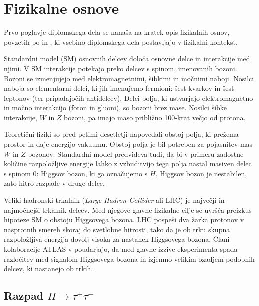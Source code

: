 \documentclass[11pt,a4paper,openany]{book}
\begin{document}


\chapter{Fizikalne osnove}
\label{ch:basics}
Prvo poglavje diplomskega dela se nanaša na kratek opis fizikalnih osnov, povzetih po \cite{AadScience2012} in \cite{ChallengeDoc}, ki vsebino diplomskega dela  postavljajo v fizikalni kontekst. 

Standardni model (SM) osnovnih delcev določa osnovne delce in interakcije med njimi. V SM interakcije potekajo preko delcev s spinom, imenovanih bozoni. Bozoni se izmenjujejo med elektromagnetnimi, šibkimi in močnimi naboji. Nosilci naboja so elementarni delci, ki jih imenujemo fermioni: šest kvarkov in šest leptonov (ter pripadajočih antidelcev). Delci polja, ki ustvarjajo elektromagnetno in močno interakcijo (foton in gluoni), so bozoni brez mase. Nosilci šibke interakcije, $W$ in $Z$ bozoni, pa imajo maso približno 100-krat večjo od protona. 

Teoretični fiziki so pred petimi desetletji napovedali obstoj polja, ki prežema prostor in daje energijo vakuumu. Obstoj polja je bil potreben za pojasnitev mas $W$ in $Z$ bozonov. Standardni model predvideva tudi, da bi v primeru zadostne količine razpoložljive energije lahko z vzbuditvijo tega polja nastal masiven delec s spinom 0: Higgsov bozon, ki ga označujemo s $H$. Higgsov bozon je nestabilen, zato hitro razpade v druge delce. 

Veliki hadronski trkalnik (\textit{Large Hadron Collider} ali {LHC}) je največji in najmočnejši trkalnik delcev. Med njegove glavne fizikalne cilje se uvršča preizkus hipoteze SM o obstoju Higgsovega bozona. LHC pospeši dva žarka protonov v nasprotnih smereh skoraj do svetlobne hitrosti, tako da je ob trku skupna razpoložljiva energija dovolj visoka za nastanek Higgsovega bozona. Člani kolaboracije ATLAS v \cite{AadScience2012} poudarjajo, da med glavne izzive eksperimenta spada razločitev med signalom Higgsovega bozona in izjemno velikim ozadjem podobnih delcev, ki nastanejo ob trkih. 

\section{Razpad $H \rightarrow \tau^+\tau^-$}
\end{document}
